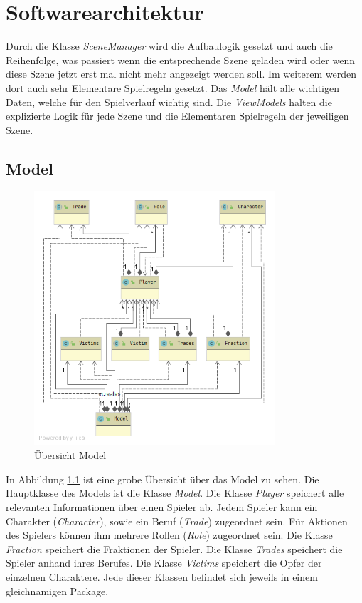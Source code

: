 \chapter{Softwarearchitektur}
Durch die Klasse \textit{SceneManager} wird die Aufbaulogik gesetzt und auch die Reihenfolge, was passiert wenn die entsprechende Szene geladen wird oder wenn diese Szene jetzt erst mal nicht mehr angezeigt werden soll. Im weiterem werden dort auch sehr Elementare Spielregeln gesetzt. Das \textit{Model} hält alle wichtigen Daten, welche für den Spielverlauf wichtig sind. Die \textit{ViewModels} halten die explizierte Logik für jede Szene und die Elementaren Spielregeln der jeweiligen Szene.
 

\section{Model}

\begin{figure}[H]
	\centering
	\includegraphics[width=0.8\textwidth]{architektur/model_uml.png}
	\caption{Übersicht Model}
	\label{figure:diagram_model}
\end{figure}

In Abbildung \ref{figure:diagram_model} ist eine grobe Übersicht über das Model zu sehen. Die Hauptklasse des Models ist die Klasse \textit{Model}. Die Klasse \textit{Player} speichert alle relevanten Informationen über einen Spieler ab. Jedem Spieler kann ein Charakter (\textit{Character}), sowie ein Beruf (\textit{Trade}) zugeordnet sein. Für Aktionen des Spielers können ihm mehrere Rollen (\textit{Role}) zugeordnet sein. Die Klasse \textit{Fraction} speichert die Fraktionen der Spieler. Die Klasse \textit{Trades} speichert die Spieler anhand ihres Berufes. Die Klasse \textit{Victims} speichert die Opfer der einzelnen Charaktere. Jede dieser Klassen befindet sich jeweils in einem gleichnamigen Package.

